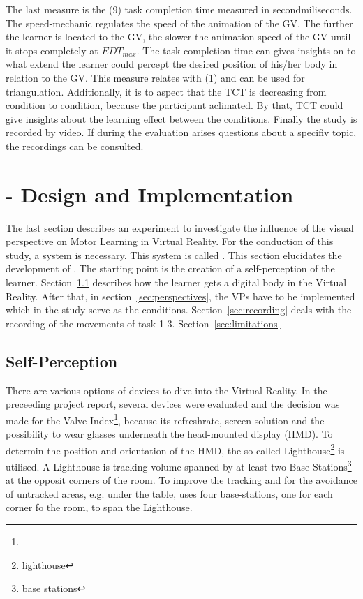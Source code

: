 The last measure is the (9) task completion time measured in secondmiliseconds. The speed-mechanic regulates the speed of the animation of the GV. The further the learner is located to the GV, the slower the animation speed of the GV until it stops completely at $EDT_{max}$. The task completion time can gives insights on to what extend the learner could percept the desired position of his/her body in relation to the GV. This measure relates with (1) and can be used for triangulation. Additionally, it is to aspect that the TCT is decreasing from condition to condition, because the participant aclimated. By that, TCT could give insights about the learning effect between the conditions. Finally the study is recorded by video. If during the evaluation arises questions about a specifiv topic, the recordings can be consulted.

\section{\exgo - Design and Implementation}
\label{section:system}
The last section describes an experiment to investigate the influence of the visual perspective on Motor Learning in Virtual Reality. For the conduction of this study, a system is necessary. This system is called \exgo. This section elucidates the development of \exgo. The starting point is the creation of a self-perception of the learner. Section~\ref{sec:selfperception} describes how the learner gets a digital body in the Virtual Reality. After that, in section~\ref{sec:perspectives}, the VPs have to be implemented which in the study serve as the conditions. Section~\ref{sec:recording} deals with the recording of the movements of task 1-3. Section~\ref{sec:limitations}

\subsection{Self-Perception}
\label{sec:selfperception}
There are various options of devices to dive into the Virtual Reality. In the preceeding project report, several devices were evaluated and the decision was made for the Valve Index\footnote{}, because its refreshrate, screen solution and the possibility to wear glasses underneath the head-mounted display (HMD). To determin the position and orientation of the HMD, the so-called Lighthouse\footnote{lighthouse} is utilised. A Lighthouse is tracking volume spanned by at least two Base-Stations\footnote{base stations} at the opposit corners of the room. To improve the tracking and for the avoidance of untracked areas, e.g. under the table, \exgo uses four base-stations, one for each corner fo the room, to span the Lighthouse.\\

